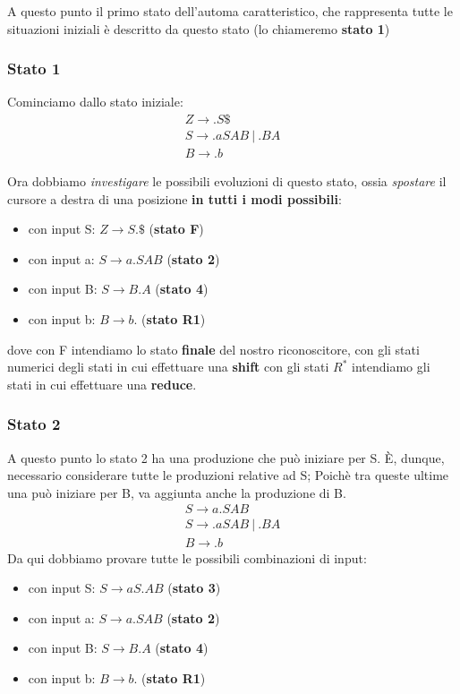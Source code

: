 \documentclass[a4paper, fleqn]{report}
\begin{document}
A questo punto il primo stato dell'automa caratteristico, che rappresenta tutte le situazioni iniziali è descritto da questo stato (lo chiameremo \textbf{stato 1})

\subsubsection{Stato 1}
Cominciamo dallo stato iniziale:
\begin{gather*}
Z \rightarrow .S \$ \\
S \rightarrow .aSAB\ |\ .BA \\
B \rightarrow .b
\end{gather*}

Ora dobbiamo \emph{investigare} le possibili evoluzioni di questo stato, ossia \emph{spostare} il cursore a destra di una posizione \textbf{in tutti i modi possibili}:
\begin{itemize}
\item con input S: \(Z \rightarrow S.\$\) (\textbf{stato F})
\item con input a: \(S \rightarrow a.SAB\) (\textbf{stato 2})
\item con input B: \(S \rightarrow B.A\) (\textbf{stato 4})
\item con input b: \(B \rightarrow b.\) (\textbf{stato R1})
\end{itemize}
dove con F intendiamo lo stato \textbf{finale} del nostro riconoscitore, con gli stati numerici degli stati in cui effettuare una \textbf{shift} con gli stati \textbf{\(R^*\)} intendiamo gli stati in cui effettuare una \textbf{reduce}.

\subsubsection{Stato 2}
A questo punto lo stato 2 ha una produzione che può iniziare per S. È, dunque, necessario considerare tutte le produzioni relative ad S; Poichè tra queste ultime una può iniziare per B, va aggiunta anche la produzione di B.
\begin{gather*}
S \rightarrow a.SAB \\
S \rightarrow .aSAB\ |\ .BA \\
B \rightarrow .b
\end{gather*}
Da qui dobbiamo provare tutte le possibili combinazioni di input:
\begin{itemize}
\item con input S: \(S \rightarrow aS.AB\) (\textbf{stato 3})
\item con input a: \(S \rightarrow a.SAB\) (\textbf{stato 2})
\item con input B: \(S \rightarrow B.A\) (\textbf{stato 4})
\item con input b: \(B \rightarrow b.\) (\textbf{stato R1})
\end{itemize}
\end{document}
